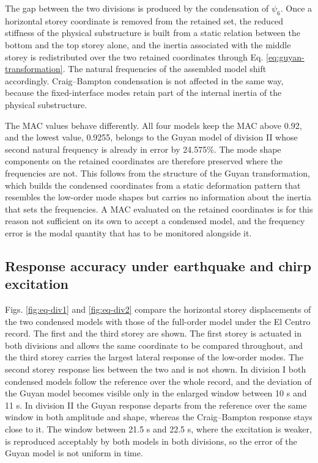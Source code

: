 \documentclass[11pt,a4paper]{article}
\numberwithin{equation}{section}
\begin{document}
The gap between the two divisions is produced by the condensation of \(\psi_{6}\). Once a horizontal storey coordinate is removed from the retained set, the reduced stiffness of the physical substructure is built from a static relation between the bottom and the top storey alone, and the inertia associated with the middle storey is redistributed over the two retained coordinates through Eq. \eqref{eq:guyan-transformation}. The natural frequencies of the assembled model shift accordingly. Craig--Bampton condensation is not affected in the same way, because the fixed-interface modes retain part of the internal inertia of the physical substructure.

The MAC values behave differently. All four models keep the MAC above 0.92, and the lowest value, 0.9255, belongs to the Guyan model of division II whose second natural frequency is already in error by 24.575\%. The mode shape components on the retained coordinates are therefore preserved where the frequencies are not. This follows from the structure of the Guyan transformation, which builds the condensed coordinates from a static deformation pattern that resembles the low-order mode shapes but carries no information about the inertia that sets the frequencies. A MAC evaluated on the retained coordinates is for this reason not sufficient on its own to accept a condensed model, and the frequency error is the modal quantity that has to be monitored alongside it.

\subsection{Response accuracy under earthquake and chirp excitation}
\label{sec:response-accuracy}

Figs. \ref{fig:eq-div1} and \ref{fig:eq-div2} compare the horizontal storey displacements of the two condensed models with those of the full-order model under the El Centro record. The first and the third storey are shown. The first storey is actuated in both divisions and allows the same coordinate to be compared throughout, and the third storey carries the largest lateral response of the low-order modes. The second storey response lies between the two and is not shown. In division I both condensed models follow the reference over the whole record, and the deviation of the Guyan model becomes visible only in the enlarged window between 10 s and 11 s. In division II the Guyan response departs from the reference over the same window in both amplitude and shape, whereas the Craig--Bampton response stays close to it. The window between 21.5 s and 22.5 s, where the excitation is weaker, is reproduced acceptably by both models in both divisions, so the error of the Guyan model is not uniform in time.
\end{document}
